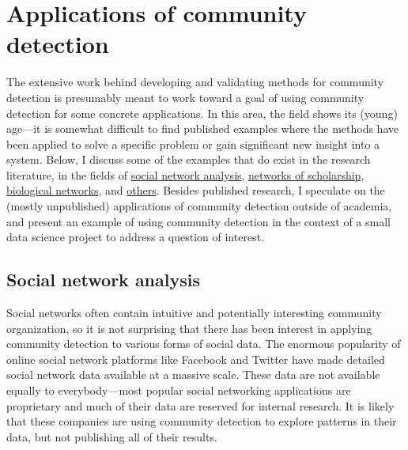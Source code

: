 \hypertarget{applications}{\section{Applications of community
detection}\label{applications}}

\protect\hyperlink{applications}{}

The extensive work behind developing and validating methods for
community detection is presumably meant to work toward a goal of using
community detection for some concrete applications. In this area, the
field shows its (young) age---it is somewhat difficult to find published
examples where the methods have been applied to solve a specific problem
or gain significant new insight into a system. Below, I discuss some of
the examples that do exist in the research literature, in the fields of
\protect\hyperlink{social-network-analysis}{social network analysis},
\protect\hyperlink{networks-of-scholarship}{networks of scholarship},
\protect\hyperlink{biological-networks}{biological networks}, and
\protect\hyperlink{other-research}{others}. Besides published research,
I speculate on the (mostly unpublished) applications of community
detection outside of academia, and present an example of using community
detection in the context of a small data science project to address a
question of interest.

\hypertarget{social-network-analysis}{\subsection{Social network
analysis}\label{social-network-analysis}}

Social networks often contain intuitive and potentially interesting
community organization, so it is not surprising that there has been
interest in applying community detection to various forms of social
data. The enormous popularity of online social network platforms like
Facebook and Twitter have made detailed social network data available at
a massive scale. These data are not available equally to
everybody---most popular social networking applications are proprietary
and much of their data are reserved for internal research. It is likely
that these companies are using community detection to explore patterns
in their data, but not publishing all of their results.

